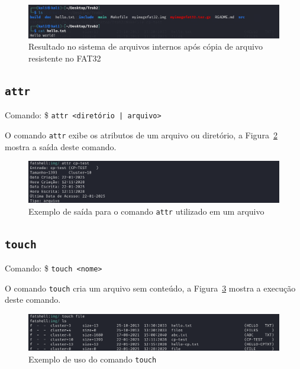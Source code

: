 \documentclass[
    12pt,				%
    oneside,   	        %
    a4paper,			%
    english,			%
    french,				%
    spanish,			%
    brazil,				%
    ]{pacotes/abntex2}
\begin{document}
\begin{figure}[H]
    \centering
    \includegraphics[width=450pt]{figuras/resultados/7-cp-arquivo-externo-resultado.PNG}
    \caption{Resultado no sistema de arquivos internos após cópia de arquivo resistente no FAT32}
    \label{fig:cp-interno-externo-2}
\end{figure}


\subsection{\texttt{attr}}
\label{subsec:attr}
Comando: \$ \texttt{attr <diretório | arquivo> }

O comando \texttt{attr} exibe os atributos de um arquivo ou diretório, a Figura~\ref{fig:attr} mostra a saída deste comando.

\begin{figure}[H]
    \centering
    \includegraphics[width=450pt]{figuras/resultados/4-attr.PNG}
    \caption{Exemplo de saída para o comando \texttt{attr} utilizado em um arquivo}
    \label{fig:attr}
\end{figure}


\subsection{\texttt{touch}}
\label{subsec:touch}
Comando: \$ \texttt{touch <nome>} 

O comando \texttt{touch} cria um arquivo sem conteúdo, a Figura~\ref{fig:touch} mostra a execução deste comando.

\begin{figure}[h!]
    \centering
    \includegraphics[width=450pt]{figuras/resultados/8-touch.PNG}
    \caption{Exemplo de uso do comando \texttt{touch}}
    \label{fig:touch}
\end{figure}
\end{document}
